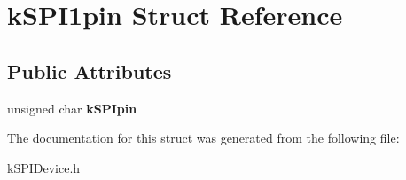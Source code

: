 \hypertarget{structkSPI1pin}{}\section{k\+S\+P\+I1pin Struct Reference}
\label{structkSPI1pin}
\subsection*{Public Attributes}
\begin{DoxyCompactItemize}
\item 
unsigned char {\bfseries k\+S\+P\+Ipin}\hypertarget{structkSPI1pin_ab931827287d8d6bac69c5557e9790ff3}{}\label{structkSPI1pin_ab931827287d8d6bac69c5557e9790ff3}

\end{DoxyCompactItemize}


The documentation for this struct was generated from the following file\+:\begin{DoxyCompactItemize}
\item 
k\+S\+P\+I\+Device.\+h\end{DoxyCompactItemize}
